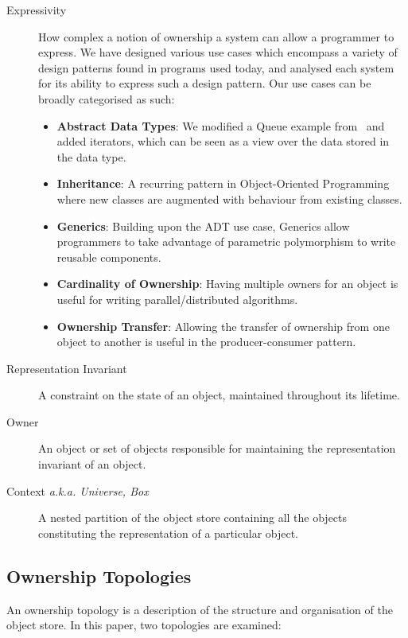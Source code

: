 \documentclass{acm_proc_article-sp}
\begin{document}
\begin{description}
	\item[Expressivity] How complex a notion of ownership a system can allow a
		programmer to express. We have designed various use cases which
		encompass a variety of design patterns found in programs used today, and
		analysed each system for its ability to express such a design pattern.
		Our use cases can be broadly categorised as such:

	\begin{itemize}
		\item \textbf{Abstract Data Types}: We modified a Queue example
		from~\cite{boyapati04safejava} and added iterators, which can be seen
		as a view over the data stored in the data type.
		\item \textbf{Inheritance}: A recurring pattern in Object-Oriented
		Programming where new classes are augmented with behaviour from existing
		classes.
		\item \textbf{Generics}: Building upon the ADT use case, Generics
		allow programmers to take advantage of parametric polymorphism to write
		reusable components.
		\item \textbf{Cardinality of Ownership}: Having multiple owners for an
		object is useful for writing parallel/distributed algorithms.
		\item \textbf{Ownership Transfer}: Allowing the transfer of ownership
		from one object to another is useful in the producer-consumer pattern.

	\end{itemize}

	\item[Representation Invariant] A constraint on the state of an object,
	maintained throughout its lifetime.
	\item[Owner] An object or set of objects responsible for maintaining the
	representation invariant of an object.
	\item[Context \emph{a.k.a. Universe, Box}] A nested partition of the object
	store containing all the objects constituting the representation of
	a particular object.

\end{description}

\subsection{Ownership Topologies}
\label{subsec:topologies}

An ownership topology is a description of the structure and organisation of the
object store. In this paper, two topologies are examined:
\end{document}
